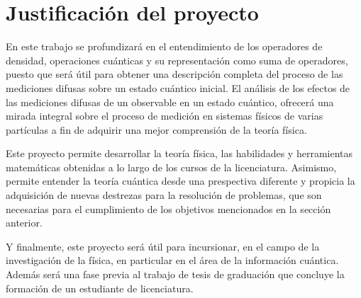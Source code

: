 

\chapter*{Justificación del proyecto}



En este trabajo se profundizará en el entendimiento de los operadores de densidad, operaciones cuánticas y su representación como suma de operadores, puesto que será útil para obtener una descripción completa del proceso de las mediciones difusas sobre un estado cuántico inicial. El análisis de los efectos de las mediciones difusas de un observable en un estado cuántico, ofrecerá una mirada integral sobre el proceso de medición en sistemas físicos de varias partículas a fin de adquirir una mejor comprensión de la teoría física.%

Este proyecto permite desarrollar la teoría física, las habilidades y herramientas matemáticas obtenidas a lo largo de los cursos de la licenciatura. Asimismo, permite entender la teoría cuántica desde una prespectiva diferente y propicia la adquisición de nuevas destrezas para la resolución de problemas, que son necesarias para el cumplimiento de los objetivos mencionados en la sección anterior.



 
  
  
 
  
 Y finalmente, este proyecto será útil para incursionar, en el campo de la investigación de la física, en particular en el área de la información cuántica. Además será una fase previa al trabajo de tesis de graduación que concluye la formación de un estudiante de licenciatura.    
